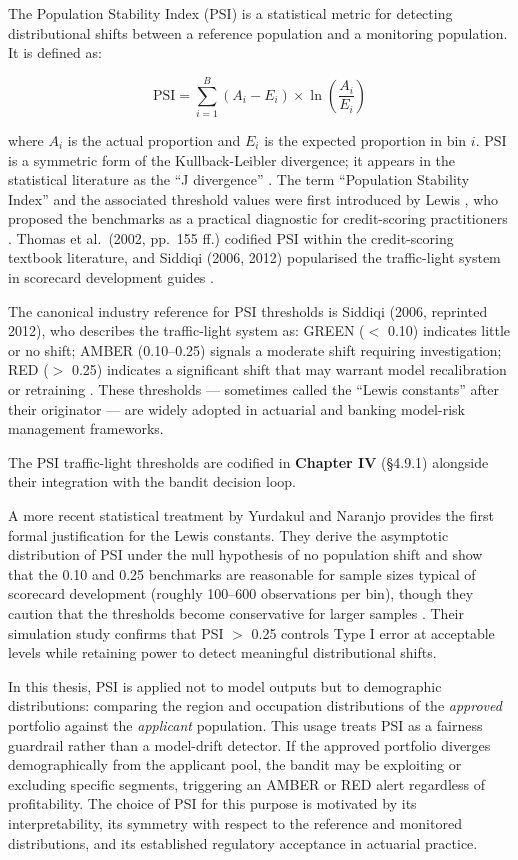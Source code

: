 The Population Stability Index (PSI) is a statistical metric for detecting distributional shifts between a reference population and a monitoring population. It is defined as:

\[\text{PSI} = \sum_{i=1}^{B} (A_i - E_i) \times \ln\left(\frac{A_i}{E_i}\right)\]

where \(A_i\) is the actual proportion and \(E_i\) is the expected proportion in bin \(i\). PSI is a symmetric form of the Kullback-Leibler divergence; it appears in the statistical literature as the ``J divergence'' \citep{Lin1991}. The term ``Population Stability Index'' and the associated threshold values were first introduced by Lewis \citeyearpar{Lewis1994}, who proposed the benchmarks as a practical diagnostic for credit-scoring practitioners \citep{Lewis1994}. Thomas et al.~(2002, pp.~155 ff.) codified PSI within the credit-scoring textbook literature, and Siddiqi (2006, 2012) popularised the traffic-light system in scorecard development guides \citep{Thomas2002, Siddiqi2006}.

The canonical industry reference for PSI thresholds is Siddiqi (2006, reprinted 2012), who describes the traffic-light system as: GREEN (\(<\) 0.10) indicates little or no shift; AMBER (0.10--0.25) signals a moderate shift requiring investigation; RED (\(>\) 0.25) indicates a significant shift that may warrant model recalibration or retraining \citep{Siddiqi2006}. These thresholds --- sometimes called the ``Lewis constants'' after their originator --- are widely adopted in actuarial and banking model-risk management frameworks.

The PSI traffic-light thresholds are codified in \textbf{Chapter IV} (§4.9.1) alongside their integration with the bandit decision loop.

A more recent statistical treatment by Yurdakul and Naranjo \citeyearpar{Yurdakul2020} provides the first formal justification for the Lewis constants. They derive the asymptotic distribution of PSI under the null hypothesis of no population shift and show that the 0.10 and 0.25 benchmarks are reasonable for sample sizes typical of scorecard development (roughly 100--600 observations per bin), though they caution that the thresholds become conservative for larger samples \citep{Yurdakul2020}. Their simulation study confirms that PSI \(>\) 0.25 controls Type I error at acceptable levels while retaining power to detect meaningful distributional shifts.

In this thesis, PSI is applied not to model outputs but to demographic distributions: comparing the region and occupation distributions of the \emph{approved} portfolio against the \emph{applicant} population. This usage treats PSI as a fairness guardrail rather than a model-drift detector. If the approved portfolio diverges demographically from the applicant pool, the bandit may be exploiting or excluding specific segments, triggering an AMBER or RED alert regardless of profitability. The choice of PSI for this purpose is motivated by its interpretability, its symmetry with respect to the reference and monitored distributions, and its established regulatory acceptance in actuarial practice.

